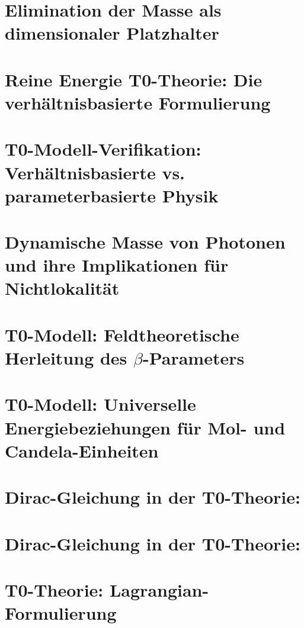 	\chapter{Elimination der Masse als dimensionaler Platzhalter}
	
	\chapter{Reine Energie T0-Theorie: Die verhältnisbasierte Formulierung}
	
	\chapter{T0-Modell-Verifikation: Verhältnisbasierte vs. parameterbasierte Physik}
	
	\chapter{Dynamische Masse von Photonen und ihre Implikationen für Nichtlokalität}
	
	\chapter{T0-Modell: Feldtheoretische Herleitung des $\beta$-Parameters}
	
	\chapter{T0-Modell: Universelle Energiebeziehungen für Mol- und Candela-Einheiten}
	
	\chapter{Dirac-Gleichung in der T0-Theorie:}
	
	\chapter{Dirac-Gleichung in der T0-Theorie:}
	
	\chapter{T0-Theorie: Lagrangian-Formulierung}
	
